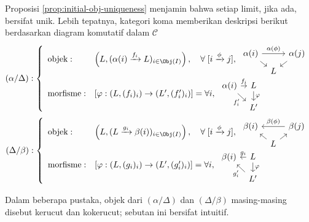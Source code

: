 Proposisi \ref{prop:initial-obj-uniqueness} menjamin bahwa setiap limit, jika ada, bersifat unik. Lebih tepatnya, kategori koma memberikan deskripsi berikut berdasarkan diagram komutatif dalam $\mathcal{C}$
\begin{equation*}\begin{gathered}
	(\alpha/\Delta): \left\{ \begin{array}{ll}
		\text{objek}: & \left( L, (\alpha(i) \xrightarrow{f_i} L)_{i \in \Obj(I)} \right), \quad \forall\; [i \xrightarrow{\phi} j], \;
			\begin{tikzcd}[column sep=tiny, row sep=tiny]
				\alpha(i) \arrow[rd] \arrow[rr, "{\alpha(\phi)}"] & & \alpha(j) \arrow[ld] \\
				{} & L &
			\end{tikzcd} \\
		\text{morfisme}: & \left[ \varphi: (L, (f_i)_i) \to (L', (f'_i)_i) \right] =  \forall i, \;
			\begin{tikzcd}[column sep=tiny, row sep=small]
				\alpha(i) \arrow[r, "f_i"] \arrow[rd, "f'_i"'] & L \arrow[d, "\varphi"] \\
				{} & L'
			\end{tikzcd}
	\end{array}\right. \\
	(\Delta/\beta): \left\{ \begin{array}{ll}
		\text{objek}: & \left( L, (L \xrightarrow{g_i} \beta(i))_{i \in \Obj(I)} \right), \quad \forall\; [i \xrightarrow{\phi} j], \;
			\begin{tikzcd}[column sep=tiny, row sep=tiny]
				\beta(i) & & \beta(j) \arrow[ll, "\beta(\phi)"'] \\
				{} & L \arrow[lu] \arrow[ru] &
			\end{tikzcd} \\
		\text{morfisme}: & \left[ \varphi: (L, (g_i)_i) \to (L', (g'_i)_i) \right] =  \forall i, \;
			\begin{tikzcd}[column sep=tiny, row sep=small]
				\beta(i) & L \arrow[d, "\varphi"] \arrow[l, "g_i"'] \\
				{} & L' \arrow[lu, "g'_i"]
			\end{tikzcd}
	\end{array}\right.
\end{gathered}\end{equation*}

Dalam beberapa pustaka, objek dari $(\alpha/\Delta)$ dan $(\Delta/\beta)$ masing-masing disebut kerucut dan kokerucut; sebutan ini bersifat intuitif.

